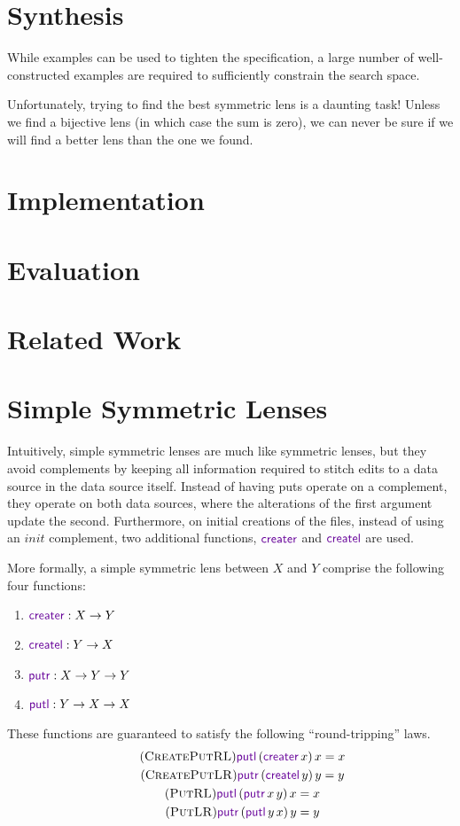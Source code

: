 \documentclass[acmsmall,screen,anonymous]{acmart}
\begin{document}
\section{Synthesis}
\label{sec:synthesis}
While examples can be used to tighten the
specification, a large number of well-constructed examples are required to
sufficiently constrain the search space.

Unfortunately, trying to find the best symmetric lens is a daunting task!
Unless we find a bijective lens (in which case the sum is zero), we can never be
sure if we will find a better lens than the one we found.

\section{Implementation}
\label{sec:implementation}

\section{Evaluation}
\label{sec:evaluation}

\section{Related Work}
\label{sec:related}

\section{Simple Symmetric Lenses}
\label{sec:ssl2}
Intuitively, simple symmetric lenses are much like symmetric lenses, but they
avoid complements by keeping all information required to stitch edits to a data
source in the data source itself. Instead of having puts operate on a
complement, they operate on both data sources, where the alterations of the
first argument update the second. Furthermore, on initial creations of the
files, instead of using an $init$ complement, two additional functions,
$\CreateR$ and $\CreateL$ are used.

More formally, a simple symmetric lens between $X$ and $Y$ comprise the
following four functions:
\begin{enumerate}
\item $\CreateR \OfType X \rightarrow Y$
\item $\CreateL \OfType Y \rightarrow X$
\item $\PutR \OfType X \rightarrow Y \rightarrow Y$
\item $\PutL \OfType Y \rightarrow X \rightarrow X$
\end{enumerate}
These functions are guaranteed to satisfy the following ``round-tripping'' laws.
\begin{gather}
  \tag{\CreatePutRL}
  \PutLOf{(\CreateROf{x})}{x} = x\\
  \tag{\CreatePutLR}
  \PutROf{(\CreateLOf{y})}{y} = y\\
  \tag{\PutRL}
  \PutLOf{(\PutROf{x}{y})}{x} = x\\
  \tag{\PutLR}
  \PutROf{(\PutLOf{y}{x})}{y} = y
\end{gather}
\end{document}
